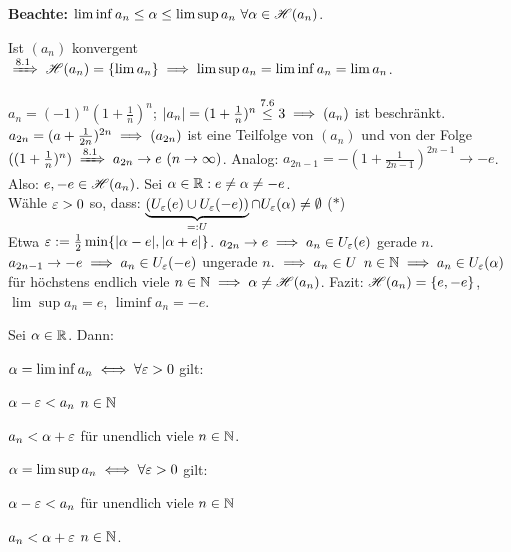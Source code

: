 \documentclass[a4paper,oneside,DIV15,BCOR12mm]{scrbook}
\begin{document}
\textbf{Beachte:} $\liminf a_n \le \alpha \le \limsup a_n \ \forall \alpha \in\mathscr{H}(a_n)$.

\begin{beispiele}
\item Ist $(a_n)$ konvergent $\folgtwegen{8.1} \H(a_n) = \{\lim a_n\} \folgt \limsup a_n = \liminf a_n = \lim a_n$.
\item $a_n = (-1)^n(1+\frac{1}{n})^n$; $|a_n| = (1+\frac{1}{n})^n \stackrel{\text{7.6}}{\le} 3 \implies (a_n)$ ist beschränkt. \\
$a_{2n} = (a + \frac{1}{2n})^{2n} \implies (a_{2n})$ ist eine Teilfolge von $(a_n)$ und von der Folge $((1+\frac{1}{n})^n)  \folgtnach{8.1} a_{2n} \to e \ (n\to\infty)$. Analog: $a_{2n-1} = -(1 + \frac{1}{2n-1})^{2n-1} \to -e $. Also: $e, -e \in \mathscr{H}(a_n)$. Sei $\alpha \in \mathbb{R}: e \ne \alpha \ne -e$.\\
Wähle $\varepsilon > 0$ so, dass: $\displaystyle\underbrace{(U_\varepsilon(e) \cup U_\varepsilon(-e))}_{=:U} \cap U_\varepsilon(\alpha) \ne \emptyset$ ($*$)\\
Etwa $\varepsilon := \frac{1}{2} \min\{|\alpha-e|, |\alpha+e|\}$. $a_{2n} \to e \implies a_n \in U_\varepsilon(e)$ \ffa gerade $n$. $a_{2n-1} \to -e \implies a_n\in U_\varepsilon(-e)$ \ffa ungerade $n$. $\implies a_n \in U$ \ffa $n\in\mathbb{N} \implies a_n\in U_\varepsilon(\alpha)$ für höchstens endlich viele $n\in\mathbb{N} \implies \alpha \ne \mathscr{H}(a_n)$. Fazit: $\mathscr{H}(a_n) = \{e, -e\}$, $\lim\sup a_n=e$, $\liminf a_n = -e$.
\end{beispiele}

\begin{satz}
Sei $\alpha \in \mathbb{R}$. Dann:

$ \alpha = \lim\inf a_n \iff \forall \varepsilon>0$ gilt:

\begin{liste}
\item $\alpha - \varepsilon < a_n$ \ffa $n\in\mathbb{N}$
\item $a_n<\alpha+\varepsilon$ für unendlich viele $n\in\mathbb{N}$.
\end{liste}

$ \alpha = \lim\sup a_n \iff \forall \varepsilon>0$ gilt:
\begin{liste}
\item $\alpha - \varepsilon < a_n$ für unendlich viele $n\in\mathbb{N}$
\item $a_n<\alpha+\varepsilon$ \ffa $n\in\mathbb{N}$.
\end{liste}
\end{satz}
\end{document}
